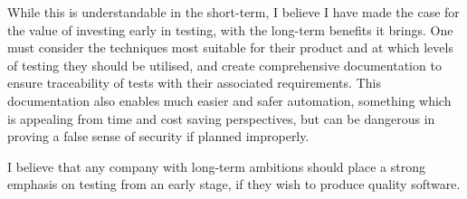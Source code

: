 \documentclass[12pt]{article}
\begin{document}
While this is understandable in the short-term, I believe I have made the case for the value of investing early in testing, with the long-term benefits it brings. One must consider the techniques most suitable for their product and at which levels of testing they should be utilised, and create comprehensive documentation to ensure traceability of tests with their associated requirements. This documentation also enables much easier and safer automation, something which is appealing from time and cost saving perspectives, but can be dangerous in proving a false sense of security if planned improperly.

I believe that any company with long-term ambitions should place a strong emphasis on testing from an early stage, if they wish to produce quality software.




\renewcommand{\bibname}{References} %
\end{document}
